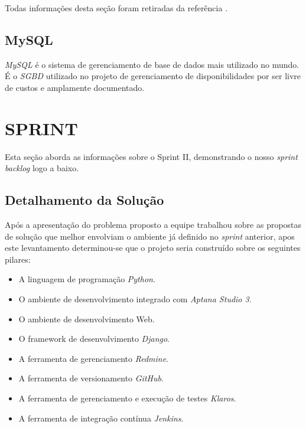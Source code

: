 \documentclass{abnt}
\begin{document}
			Todas informações desta seção foram retiradas da referência \cite{KLAROS}.
			
	\section{MySQL}

		\emph{MySQL} é o sistema de gerenciamento de base de dados mais utilizado no mundo.
		É o \emph{SGBD} utilizado no projeto de gerenciamento de disponibilidades por ser livre de custos
		e amplamente documentado.\cite{MYSQLWIKI}
	
\clearpage

\chapter{SPRINT}
	
		Esta seção aborda as informações sobre o Sprint II, demonstrando o nosso \emph{sprint backlog} logo a baixo.
	
	\section{Detalhamento da Solução}
	
		Após a apresentação do problema proposto a equipe trabalhou sobre as propostas de solução que melhor envolviam o ambiente já definido no \emph{sprint} anterior,
		apos este levantamento determinou-se que o projeto seria construído sobre os seguintes pilares:
		\begin{itemize}
		\item  A linguagem de programação \emph{Python}.
		\item O ambiente de desenvolvimento integrado com \emph{Aptana Studio 3}.
		\item O ambiente de desenvolvimento Web.
		\item  O framework de desenvolvimento \emph{Django}.
		\item  A ferramenta de gerenciamento \emph{Redmine}.
		\item  A ferramenta de versionamento \emph{GitHub}.
		\item  A ferramenta de gerenciamento e execução de testes \emph{Klaros}.
		\item  A ferramenta de integração contínua \emph{Jenkins}.
		\end{itemize}
		
\end{document}
